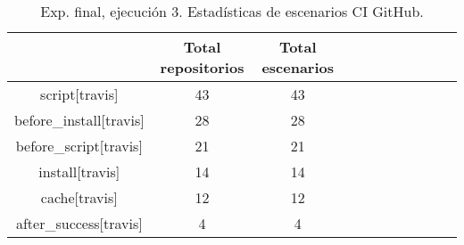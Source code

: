 \begin{table}
  \centering
  \caption{Exp. final, ejecución 3. Estadísticas de escenarios CI GitHub.}
  \label{tab:tabla_f3_5}

\begin{footnotesize}
\renewcommand{\arraystretch}{1.5} %
\begin{tabular}{ccccccccccc}
  \hline
  {} &  Total repositorios &  Total escenarios \\
  \hline
  script[travis]         &                  43 &            43 \\
  before\_install[travis] &                  28 &            28 \\
  before\_script[travis]  &                  21 &            21 \\
  install[travis]        &                  14 &            14 \\
  cache[travis]          &                  12 &            12 \\
  after\_success[travis]  &                   4 &             4 \\
 \end{tabular}
\end{footnotesize}

\end{table}